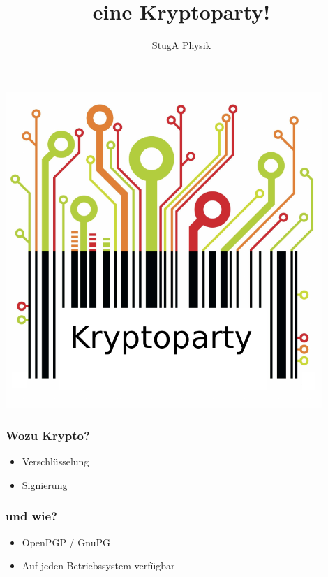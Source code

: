 \documentclass[14pt]{beamer}
\author{StugA Physik}
\title[Kryptoparty]{eine Kryptoparty!}
\begin{document}
\begin{frame}[plain]
    \begin{center}
        \includegraphics[keepaspectratio=true,width=0.9\textwidth]{kryptoparty_logo.pdf}
    \end{center}
\end{frame}


\begin{frame}
    \frametitle{Wozu Krypto?}
    \begin{itemize}
        \item Verschlüsselung
        \item Signierung
    \end{itemize}

\end{frame}

\begin{frame}
    \frametitle{und wie?}
    \begin{itemize}
        \item OpenPGP / GnuPG
        \item Auf jeden Betriebssystem verfügbar
    \end{itemize}

\end{frame}
\end{document}
